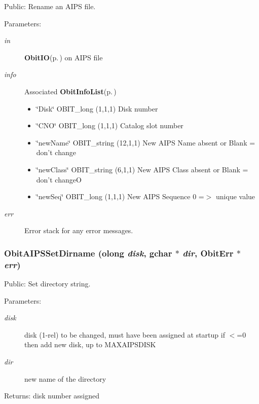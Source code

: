 Public: Rename an AIPS file. 

\begin{Desc}
\item[Parameters:]
\begin{description}
\item[{\em in}]{\bf Obit\-IO}{\rm (p.\,\pageref{structObitIO})} on AIPS file \item[{\em info}]Associated {\bf Obit\-Info\-List}{\rm (p.\,\pageref{structObitInfoList})} \begin{itemize}
\item \char`\"{}Disk\char`\"{} OBIT\_\-long (1,1,1) Disk number \item \char`\"{}CNO\char`\"{} OBIT\_\-long (1,1,1) Catalog slot number \item \char`\"{}new\-Name\char`\"{} OBIT\_\-string (12,1,1) New AIPS Name absent or Blank = don't change \item \char`\"{}new\-Class\char`\"{} OBIT\_\-string (6,1,1) New AIPS Class absent or Blank = don't change\-O \item \char`\"{}new\-Seq\char`\"{} OBIT\_\-long (1,1,1) New AIPS Sequence 0 =$>$ unique value \end{itemize}
\item[{\em err}]Error stack for any error messages. \end{description}
\end{Desc}
\subsubsection{ Obit\-AIPSSet\-Dirname ({\bf olong} {\em disk}, gchar $\ast$ {\em dir}, {\bf Obit\-Err} $\ast$ {\em err})}\label{ObitAIPS_8h_a14}


Public: Set directory string. 

\begin{Desc}
\item[Parameters:]
\begin{description}
\item[{\em disk}]disk (1-rel) to be changed, must have been assigned at startup if $<$=0 then add new disk, up to MAXAIPSDISK \item[{\em dir}]new name of the directory \end{description}
\end{Desc}
\begin{Desc}
\item[Returns:]disk number assigned \end{Desc}
